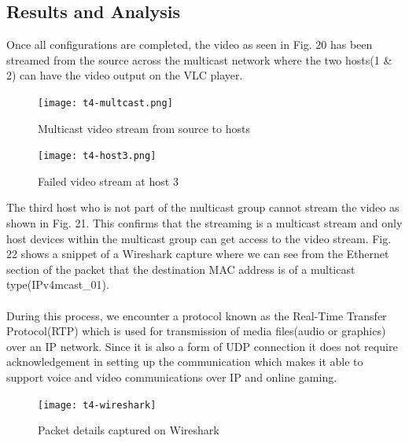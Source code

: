 \documentclass{article}
\begin{document}
\subsection{Results and Analysis}
Once all configurations are completed, the video as seen in Fig. 20 has been streamed from the source across the multicast network where the two hosts(1 \& 2) can have the video output on the VLC player.
	\begin{figure}[h]
		\centering
		\texttt{[image: t4-multcast.png]}
		\caption{Multicast video stream from source to hosts}
		\label{fig:t4-4}
	\end{figure}
	\begin{figure}[h]
		\centering
		\texttt{[image: t4-host3.png]}
		\caption{Failed video stream at host 3}
		\label{fig:t4-5}
	\end{figure}
\par The third host who is not part of the multicast group cannot stream the video as shown in Fig. 21. This confirms that the streaming is a multicast stream and only host devices within the multicast group can get access to the video stream. Fig. 22 shows a snippet of a Wireshark capture where we can see from the Ethernet section of the packet that the destination MAC address is of a multicast type(IPv4mcast\_01). \\\\ During this process, we encounter a protocol known as the Real-Time Transfer Protocol(RTP) which is used for transmission of media files(audio or graphics) over an IP network. Since it is also a form of UDP connection it does not require acknowledgement in setting up the communication which makes it able to support voice and video communications over IP and online gaming.

\newpage
	\begin{figure}[h]
		\centering
		\texttt{[image: t4-wireshark]}
		\caption{Packet details captured on Wireshark}
		\label{fig:t4-6}
	\end{figure}
	
\end{document}
